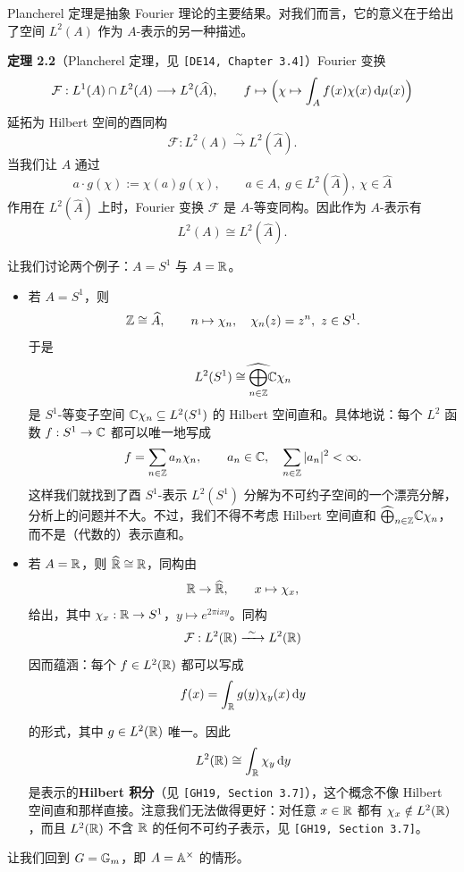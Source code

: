 Plancherel 定理是抽象 Fourier 理论的主要结果。对我们而言，它的意义在于给出了空间 $L^2(A)$ 作为 $A$-表示的另一种描述。

\noindent\textbf{定理 2.2}（Plancherel 定理，见 \texttt{[DE14, Chapter 3.4]}）\label{thm:2.2}\quad Fourier 变换
\[
\mathcal F:L^1(A)\cap L^2(A)\longrightarrow L^2(\widehat A),\qquad
f\mapsto\Bigl(\chi\mapsto\int_A f(x)\chi(x)\,\mathrm{d}\mu(x)\Bigr)
\]
延拓为 Hilbert 空间的酉同构
\[
\mathcal F:L^2(A)\xrightarrow{\ \sim\ }L^2(\widehat A).
\]
当我们让 $A$ 通过
\[
a\cdot g(\chi):=\chi(a)g(\chi),\qquad a\in A,\ g\in L^2(\widehat A),\ \chi\in\widehat A
\]
作用在 $L^2(\widehat A)$ 上时，Fourier 变换 $\mathcal F$ 是 $A$-等变同构。因此作为 $A$-表示有
\[
L^2(A)\cong L^2(\widehat A).
\]

让我们讨论两个例子：$A=S^1$ 与 $A=\mathbb{R}$。

\begin{itemize}
\item 若 $A=S^1$，则
\[
\mathbb{Z}\cong\widehat{A},\qquad n\mapsto\chi_n,\quad \chi_n(z)=z^n,\ z\in S^1.
\]
于是
\[
L^2(S^1)\cong\widehat{\bigoplus_{n\in\mathbb{Z}}}\mathbb{C}\chi_n
\]
是 $S^1$-等变子空间 $\mathbb{C}\chi_n\subseteq L^2(S^1)$ 的 Hilbert 空间直和。具体地说：每个 $L^2$ 函数 $f:S^1\to\mathbb{C}$ 都可以唯一地写成
\[
f=\sum_{n\in\mathbb{Z}}a_n\chi_n,\qquad a_n\in\mathbb{C},\quad \sum_{n\in\mathbb{Z}}|a_n|^2<\infty.
\]
这样我们就找到了酉 $S^1$-表示 $L^2(S^1)$ 分解为不可约子空间的一个漂亮分解，分析上的问题并不大。不过，我们不得不考虑 Hilbert 空间直和 $\widehat{\bigoplus}_{n\in\mathbb{Z}}\mathbb{C}\chi_n$，而不是（代数的）表示直和。
\item 若 $A=\mathbb{R}$，则 $\widehat{\mathbb{R}}\cong\mathbb{R}$，同构由
\[
\mathbb{R}\to\widehat{\mathbb{R}},\qquad x\mapsto\chi_x,
\]
给出，其中 $\chi_x:\mathbb{R}\to S^1$，$y\mapsto e^{2\pi ixy}$。同构
\[
\mathcal F:L^2(\R)\xrightarrow{\ \sim\ }L^2(\R)
\]
因而蕴涵：每个 $f\in L^2(\mathbb{R})$ 都可以写成
\[
f(x)=\int_{\mathbb{R}} g(y)\chi_y(x)\,\mathrm{d}y
\]

的形式，其中 $g\in L^2(\mathbb{R})$ 唯一。因此
\[
L^2(\mathbb{R})\cong\int_{\mathbb{R}}\chi_y\,\mathrm{d}y
\]
是表示的\textbf{Hilbert 积分}（见 \texttt{[GH19, Section 3.7]}），这个概念不像 Hilbert 空间直和那样直接。注意我们无法做得更好：对任意 $x\in\mathbb{R}$ 都有 $\chi_x\notin L^2(\mathbb{R})$，而且 $L^2(\mathbb{R})$ 不含 $\mathbb{R}$ 的任何不可约子表示，见 \texttt{[GH19, Section 3.7]}。
\end{itemize}

让我们回到 $G=\mathbb{G}_m$，即 $A=\mathbb{A}^\times$ 的情形。

